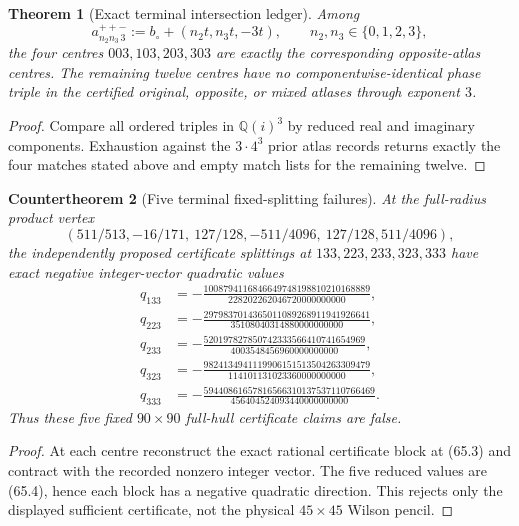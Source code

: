 \documentclass[11pt,oneside]{article}
\newtheorem{theorem}{Theorem}[section]
\newtheorem{countertheorem}[theorem]{Countertheorem}
\theoremstyle{definition}
\theoremstyle{remark}
\begin{document}
\begin{theorem}[Exact terminal intersection ledger]
\label{thm:newv65-intersections}
Among
\[
 a_{n_2n_3\,3}^{++-}
 :=b_\circ+(n_2t,n_3t,-3t),
 \qquad n_2,n_3\in\{0,1,2,3\},                        \tag{65.2}
\]
the four centres \(003,103,203,303\) are exactly the corresponding
opposite-atlas centres.  The remaining twelve centres have no
componentwise-identical phase triple in the certified original,
opposite, or mixed atlases through exponent \(3\).
\end{theorem}

\begin{proof}
Compare all ordered triples in \(\mathbb Q(i)^3\) by reduced real
and imaginary components.  Exhaustion against the
\(3\cdot4^3\) prior atlas records returns exactly the four matches
stated above and empty match lists for the remaining twelve.
\end{proof}

\begin{countertheorem}[Five terminal fixed-splitting failures]
\label{ctr:newv65-five-failures}
At the full-radius product vertex
\[
 (511/513,-16/171,\ 127/128,-511/4096,\
   127/128,511/4096),                                 \tag{65.3}
\]
the independently proposed certificate splittings at
\(133,223,233,323,333\) have exact negative integer-vector
quadratic values
\[
\begin{aligned}
q_{133}&=-\frac{1008794116846649748198810210168889}
 {228202262046720000000000},\\
q_{223}&=-\frac{2979837014365011089268911941926641}
 {35108040314880000000000},\\
q_{233}&=-\frac{520197827850742333566410741654969}
 {4003548456960000000000},\\
q_{323}&=-\frac{9824134941119906151513504263309479}
 {114101131023360000000000},\\
q_{333}&=-\frac{59440861657816566310137537110766469}
 {456404524093440000000000}.
\end{aligned}                                         \tag{65.4}
\]
Thus these five fixed \(90\times90\) full-hull certificate claims
are false.
\end{countertheorem}

\begin{proof}
At each centre reconstruct the exact rational certificate block at
(65.3) and contract with the recorded nonzero integer vector.
The five reduced values are (65.4), hence each block has a negative
quadratic direction.  This rejects only the displayed sufficient
certificate, not the physical \(45\times45\) Wilson pencil.
\end{proof}
\end{document}
